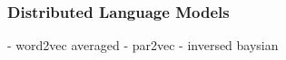 \subsubsection{Distributed Language Models}

- word2vec averaged
- par2vec
- inversed baysian

%
%
%
%
%
%
%
%
%
%
%
%
%
